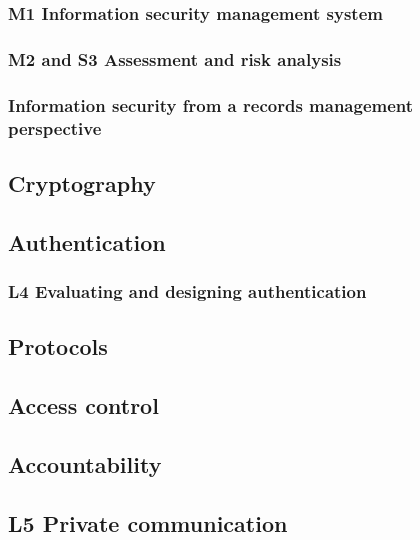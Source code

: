 \subsubsection{M1 Information security management system}


\subsubsection{M2 and S3 Assessment and risk analysis}%
\label{risksem}


\subsubsection{Information security from a records management perspective}


\subsection{Cryptography}%
\label{crypto}


\subsection{Authentication}%
\label{authentication}


\subsubsection{L4 Evaluating and designing authentication}%
\label{pwdeval}


\subsection{Protocols}%
\label{protocols}


\subsection{Access control}%
\label{ac}


\subsection{Accountability}%
\label{accountability}


\subsection{L5 Private communication}%
\label{pricomlab}


